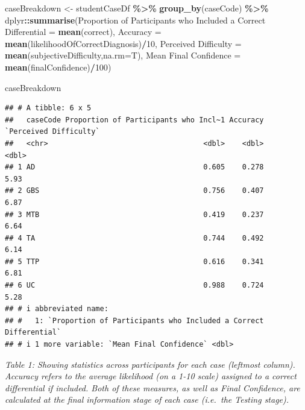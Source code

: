 \documentclass[a4paper, nobind]{templates/ociamthesis}
\newenvironment{Shaded}{\begin{snugshade}}{\end{snugshade}}
\newcommand{\AttributeTok}[1]{\textcolor[rgb]{0.13,0.29,0.53}{#1}}
\newcommand{\DecValTok}[1]{\textcolor[rgb]{0.00,0.00,0.81}{#1}}
\newcommand{\FunctionTok}[1]{\textcolor[rgb]{0.13,0.29,0.53}{\textbf{#1}}}
\newcommand{\NormalTok}[1]{#1}
\newcommand{\OtherTok}[1]{\textcolor[rgb]{0.56,0.35,0.01}{#1}}
\newcommand{\SpecialCharTok}[1]{\textcolor[rgb]{0.81,0.36,0.00}{\textbf{#1}}}
\newcommand{\StringTok}[1]{\textcolor[rgb]{0.31,0.60,0.02}{#1}}
\renewenvironment{Shaded}
{
  \vspace{10pt}%
  \begin{snugshade}%
}{%
  \end{snugshade}%
  \vspace{8pt}%
}
\begin{document}
\begin{Shaded}
\begin{Highlighting}[]
\NormalTok{caseBreakdown }\OtherTok{\textless{}{-}}\NormalTok{ studentCaseDf }\SpecialCharTok{\%\textgreater{}\%}
  \FunctionTok{group\_by}\NormalTok{(caseCode) }\SpecialCharTok{\%\textgreater{}\%}
\NormalTok{  dplyr}\SpecialCharTok{::}\FunctionTok{summarise}\NormalTok{(}\StringTok{\textasciigrave{}}\AttributeTok{Proportion of Participants who Included a Correct Differential}\StringTok{\textasciigrave{}} \OtherTok{=} \FunctionTok{mean}\NormalTok{(correct),}
                   \AttributeTok{Accuracy =} \FunctionTok{mean}\NormalTok{(likelihoodOfCorrectDiagnosis)}\SpecialCharTok{/}\DecValTok{10}\NormalTok{,}
                   \StringTok{\textasciigrave{}}\AttributeTok{Perceived Difficulty}\StringTok{\textasciigrave{}} \OtherTok{=} \FunctionTok{mean}\NormalTok{(subjectiveDifficulty,}\AttributeTok{na.rm=}\NormalTok{T),}
                   \StringTok{\textasciigrave{}}\AttributeTok{Mean Final Confidence}\StringTok{\textasciigrave{}} \OtherTok{=} \FunctionTok{mean}\NormalTok{(finalConfidence)}\SpecialCharTok{/}\DecValTok{100}\NormalTok{)}

\NormalTok{caseBreakdown}
\end{Highlighting}
\end{Shaded}

\begin{verbatim}
## # A tibble: 6 x 5
##   caseCode Proportion of Participants who Incl~1 Accuracy `Perceived Difficulty`
##   <chr>                                    <dbl>    <dbl>                  <dbl>
## 1 AD                                       0.605    0.278                   5.93
## 2 GBS                                      0.756    0.407                   6.87
## 3 MTB                                      0.419    0.237                   6.64
## 4 TA                                       0.744    0.492                   6.14
## 5 TTP                                      0.616    0.341                   6.81
## 6 UC                                       0.988    0.724                   5.28
## # i abbreviated name:
## #   1: `Proportion of Participants who Included a Correct Differential`
## # i 1 more variable: `Mean Final Confidence` <dbl>
\end{verbatim}

\emph{Table 1: Showing statistics across participants for each case (leftmost column). Accuracy refers to the average likelihood (on a 1-10 scale) assigned to a correct differential if included. Both of these measures, as well as Final Confidence, are calculated at the final information stage of each case (i.e.~the Testing stage).}
\end{document}
